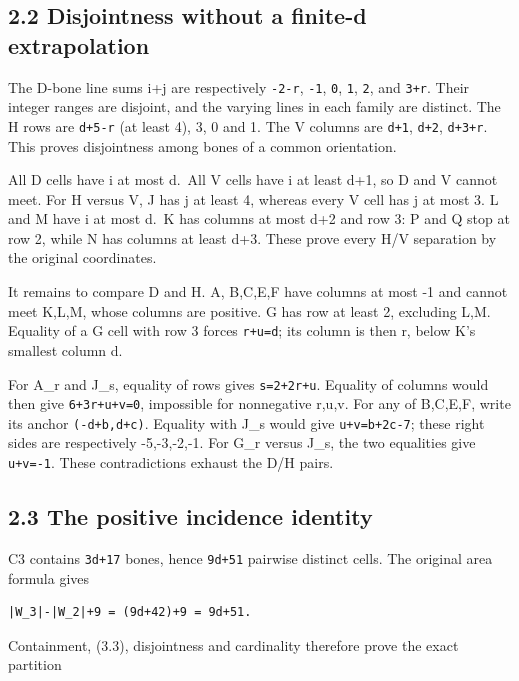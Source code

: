 \documentclass[
  10pt,
]{scrreprt}
\begin{document}
\subsection{2.2 Disjointness without a finite-d
extrapolation}\label{edition-6-section-4}

The D-bone line sums i+j are respectively \texttt{-2-r}, \texttt{-1},
\texttt{0}, \texttt{1}, \texttt{2}, and \texttt{3+r}. Their integer
ranges are disjoint, and the varying lines in each family are distinct.
The H rows are \texttt{d+5-r} (at least 4), 3, 0 and 1. The V columns
are \texttt{d+1}, \texttt{d+2}, \texttt{d+3+r}. This proves disjointness
among bones of a common orientation.

All D cells have i at most d.~All V cells have i at least d+1, so D and
V cannot meet. For H versus V, J has j at least 4, whereas every V cell
has j at most 3. L and M have i at most d.~K has columns at most d+2 and
row 3: P and Q stop at row 2, while N has columns at least d+3. These
prove every H/V separation by the original coordinates.

It remains to compare D and H. A, B,C,E,F have columns at most -1 and
cannot meet K,L,M, whose columns are positive. G has row at least 2,
excluding L,M. Equality of a G cell with row 3 forces \texttt{r+u=d};
its column is then r, below K's smallest column d.

For A\_r and J\_s, equality of rows gives \texttt{s=2+2r+u}. Equality of
columns would then give \texttt{6+3r+u+v=0}, impossible for nonnegative
r,u,v. For any of B,C,E,F, write its anchor \texttt{(-d+b,d+c)}.
Equality with J\_s would give \texttt{u+v=b+2c-7}; these right sides are
respectively -5,-3,-2,-1. For G\_r versus J\_s, the two equalities give
\texttt{u+v=-1}. These contradictions exhaust the D/H pairs.

\subsection{2.3 The positive incidence
identity}\label{edition-6-section-5}

C3 contains \texttt{3d+17} bones, hence \texttt{9d+51} pairwise distinct
cells. The original area formula gives

\begin{verbatim}
|W_3|-|W_2|+9 = (9d+42)+9 = 9d+51.
\end{verbatim}

Containment, (3.3), disjointness and cardinality therefore prove the
exact partition
\end{document}
